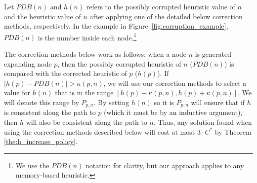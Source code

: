 \documentclass[letterpaper]{article}
\newcommand{\roni}[1]{\mbox{\tt RONI: #1}}
\begin{document}


Let $PDB(n)$ and $h(n)$ refers to the possibly corrupted heuristic value of $n$ and the heuristic value of $n$ after applying one of the detailed below correction methods, respectively. In the example in Figure~\ref{fig:corruption_example}, $PDB(n)$ is the number inside each node.\footnote{We use the $PDB(n)$ notation for clarity, but our approach applies to any memory-based heuristic.}  


% 
The correction methods below work as follows: when a node $n$ is generated expanding node $p$, then the possibly corrupted heuristic of $n$  ($PDB(n)$) is compared with the corrected heuristic of $p$ ($h(p)$). If $|h(p) - PDB(n)| > \kappa(p, n)$, we will use our correction methods to select a value for $h(n)$ that is in the range $[h(p)-\kappa(p,n),h(p)+\kappa(p,n)]$.
We will denote this range by $P_{p,n}$.
By setting $h(n)$ so it is $P_{p,n}$ will ensure that if $h$ is consistent along the path to $p$ (which it must be by an inductive argument), then $h$ will also be consistent along the path to $n$. 
Thus, any solution found when using the correction methods described below will cost at most $3 \cdot C^*$  by Theorem \ref{the:h_increase_policy}.




%
\end{document}
